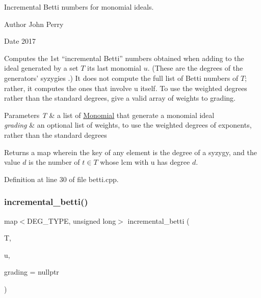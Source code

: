 Incremental Betti numbers for monomial ideals. 

\begin{DoxyAuthor}{Author}
John Perry 
\end{DoxyAuthor}
\begin{DoxyDate}{Date}
2017
\end{DoxyDate}
Computes the 1st ``incremental Betti'' numbers obtained when adding to the ideal generated by a set $ T $ its last monomial $ u $. (These are the degrees of the generators' syzygies \cite{KR05}.) It does not compute the full list of Betti numbers of $ T $; rather, it computes the ones that involve {\ttfamily u} itself. To use the weighted degrees rather than the standard degrees, give a valid array of weights to {\ttfamily grading}. 
\begin{DoxyParams}{Parameters}
{\em T} & a list of \hyperlink{group__polygroup_class_monomial}{Monomial} that generate a monomial ideal \\
\hline
{\em grading} & an optional list of weights, to use the weighted degrees of exponents, rather than the standard degrees \\
\hline
\end{DoxyParams}
\begin{DoxyReturn}{Returns}
a map wherein the key of any element is the degree of a syzygy, and the value $ d $ is the number of $ t\in T $ whose lcm with {\ttfamily u} has degree $ d $. 
\end{DoxyReturn}


Definition at line 30 of file betti.\+cpp.

\mbox{\label{group__commalg_ga0c0869fddcdc6498993507e6b4f88658}} 
\subsubsection{\texorpdfstring{incremental\+\_\+betti()}{incremental\_betti()}\hspace{0.1cm}{\footnotesize\ttfamily [2/2]}}
{\footnotesize\ttfamily map$<$D\+E\+G\+\_\+\+T\+Y\+PE, unsigned long$>$ incremental\+\_\+betti (\begin{DoxyParamCaption}\item[{const list$<$ \hyperlink{group__polygroup_class_monomial}{Monomial} $>$ \&}]{T,  }\item[{const \hyperlink{group__polygroup_class_monomial}{Monomial} \&}]{u,  }\item[{const W\+T\+\_\+\+T\+Y\+PE $\ast$}]{grading = {\ttfamily nullptr} }\end{DoxyParamCaption})\hspace{0.3cm}{\ttfamily [inline]}}



